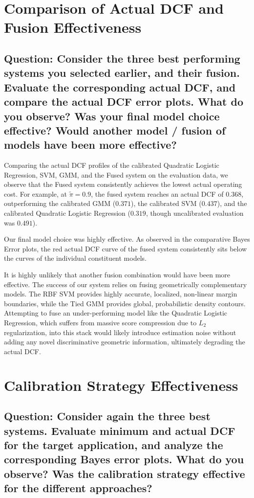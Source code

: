 \section{Comparison of Actual DCF and Fusion Effectiveness}

\subsection*{Question: Consider the three best performing systems you selected earlier, and their fusion. Evaluate the corresponding actual DCF, and compare the actual DCF error plots. What do you observe? Was your final model choice effective? Would another model / fusion of models have been more effective?}

Comparing the actual DCF profiles of the calibrated Quadratic Logistic Regression, SVM, GMM, and the Fused system on the evaluation data, we observe that the Fused system consistently achieves the lowest actual operating cost. For example, at $\tilde{\pi}=0.9$, the fused system reaches an actual DCF of $0.368$, outperforming the calibrated GMM ($0.371$), the calibrated SVM ($0.437$), and the calibrated Quadratic Logistic Regression ($0.319$, though uncalibrated evaluation was $0.491$). 

Our final model choice was highly effective. As observed in the comparative Bayes Error plots, the red actual DCF curve of the fused system consistently sits below the curves of the individual constituent models. 

It is highly unlikely that another fusion combination would have been more effective. The success of our system relies on fusing geometrically complementary models. The RBF SVM provides highly accurate, localized, non-linear margin boundaries, while the Tied GMM provides global, probabilistic density contours. Attempting to fuse an under-performing model like the Quadratic Logistic Regression, which suffers from massive score compression due to $L_2$ regularization, into this stack would likely introduce estimation noise without adding any novel discriminative geometric information, ultimately degrading the actual DCF.

\section{Calibration Strategy Effectiveness}

\subsection*{Question: Consider again the three best systems. Evaluate minimum and actual DCF for the target application, and analyze the corresponding Bayes error plots. What do you observe? Was the calibration strategy effective for the different approaches?}

